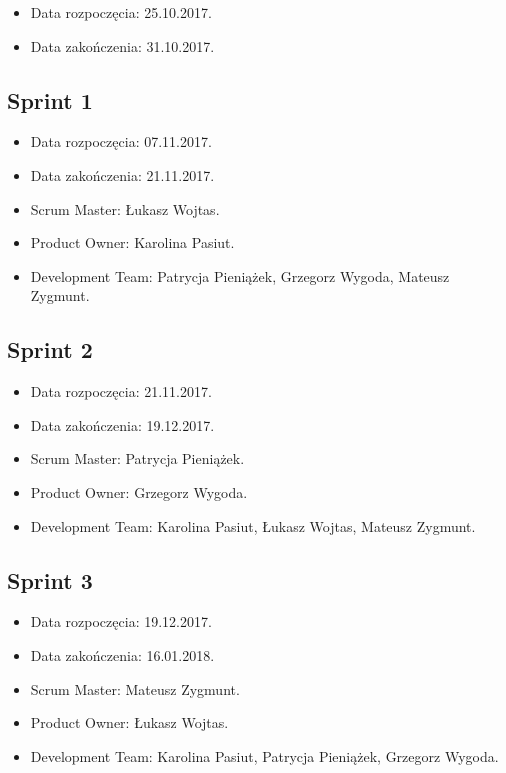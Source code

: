 \documentclass[a4paper]{article}
\begin{document}
\begin{itemize}
\item Data rozpoczęcia: 25.10.2017.
\item  Data zakończenia: 31.10.2017.
\end{itemize}

\subsection{Sprint 1}

\begin{itemize}
\item Data rozpoczęcia: 07.11.2017.
\item Data zakończenia: 21.11.2017.
\item Scrum Master: Łukasz Wojtas.
\item Product Owner: Karolina Pasiut.
\item Development Team: Patrycja Pieniążek, Grzegorz Wygoda, Mateusz Zygmunt.
\end{itemize}

\subsection{Sprint 2}

\begin{itemize}
\item Data rozpoczęcia: 21.11.2017.
\item  Data zakończenia: 19.12.2017.
\item Scrum Master: Patrycja Pieniążek.
\item Product Owner: Grzegorz Wygoda.
\item Development Team: Karolina Pasiut, Łukasz Wojtas, Mateusz Zygmunt.
\end{itemize}

\subsection{Sprint 3}

\begin{itemize}
\item Data rozpoczęcia: 19.12.2017.
\item  Data zakończenia: 16.01.2018.
\item Scrum Master: Mateusz Zygmunt.
\item Product Owner: Łukasz Wojtas.
\item Development Team: Karolina Pasiut, Patrycja Pieniążek, Grzegorz Wygoda.
\end{itemize}
\end{document}
